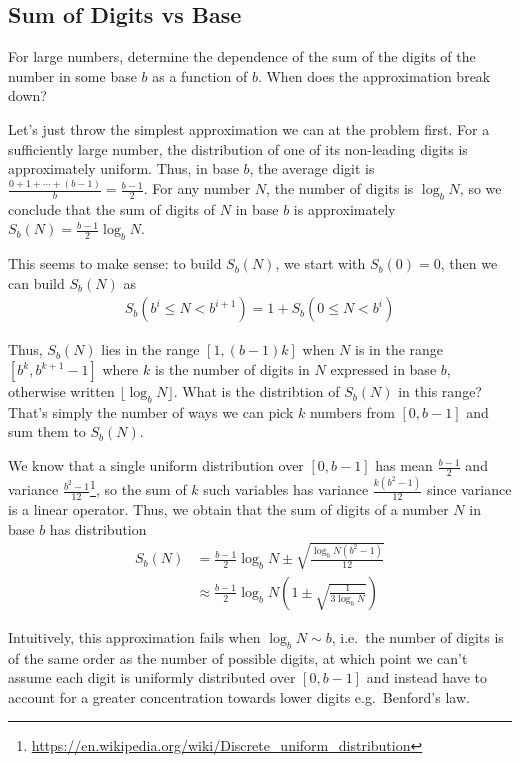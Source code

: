 \documentclass[12pt]{report}
\begin{document}
\subsection{Sum of Digits vs Base}

For large numbers, determine the dependence of the sum of the digits of the
number in some base $b$ as a function of $b$. When does the approximation break
down?

Let's just throw the simplest approximation we can at the problem first. For a
sufficiently large number, the distribution of one of its non-leading digits is
approximately uniform. Thus, in base $b$, the average digit is
$\frac{0 + 1 + \cdots + (b-1)}{b} = \frac{b - 1}{2}$. For any number $N$, the
number of digits is $\log_b N$, so we conclude that the sum of digits of $N$ in
base $b$ is approximately $S_b(N) = \frac{b - 1}{2}\log_b N$.

This seems to make sense: to build $S_b(N)$, we start with $S_b(0) = 0$, then we
can build $S_b(N)$ as
\begin{align*}
    S_b(b^i \leq N < b^{i+1}) = 1 + S_b(0 \leq N < b^i)
\end{align*}

Thus, $S_b(N)$ lies in the range  $\left[1, (b - 1)k\right]$ when $N$ is in the
range $[b^k, b^{k + 1} - 1]$ where $k$ is the number of digits in $N$ expressed
in base $b$, otherwise written $\lfloor \log_b N\rfloor$. What is the
distribtion of $S_b(N)$ in this range? That's simply the number of ways we can
pick $k$ numbers from $[0, b - 1]$ and sum them to $S_b(N)$.

We know that a single uniform distribution over $[0, b - 1]$ has mean $\frac{b -
1}{2}$ and variance $\frac{b^2 - 1}{12}$\footnote
{\url{https://en.wikipedia.org/wiki/Discrete_uniform_distribution}}, so
the sum of $k$ such variables has variance $\frac{k(b^2 - 1)}{12}$ since
variance is a linear operator. Thus, we obtain that the sum of digits of a
number $N$ in base $b$ has distribution
\begin{align}
    S_b(N)
        &= \frac{b - 1}{2}\log_b N \pm \sqrt{\frac{\log_b N (b^2 - 1)}{12}}\\
        &\approx
            \frac{b - 1}{2}\log_b N \left(1 \pm \sqrt{\frac{1}{3\log_b N}}
            \right)
\end{align}

Intuitively, this approximation fails when $\log_b N \sim b$, i.e.\ the number
of digits is of the same order as the number of possible digits, at which point
we can't assume each digit is uniformly distributed over $[0, b - 1]$ and
instead have to account for a greater concentration towards lower digits e.g.\
Benford's law.
\end{document}
